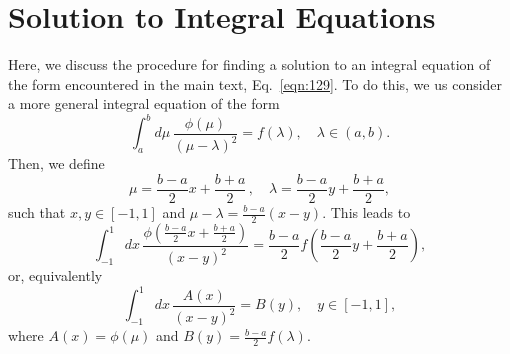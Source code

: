 \documentclass[aps,pra,
superscriptaddress,
reprint,twocolumn,preprintnumbers,
amsmath,amssymb,
nofootinbib]{revtex4-1}
\begin{document}
%        


	\section{Solution to Integral Equations}
	\label{app:E}
Here, we discuss the procedure for finding a solution to an integral equation of the form encountered in the main text, Eq.~\eqref{eqn:129}. To do this, we us consider a more general integral equation of the form
		\begin{equation}
		\int_{a}^b d\mu\,\frac{\phi(\mu)}{(\mu - \lambda)^2} = f(\lambda) ,\quad \lambda \in (a,b).
		\end{equation}				
Then, we define 
		\begin{equation}
		\mu = \frac{b - a}{2}x + \frac{b + a}{2} \, ,\quad \lambda = \frac{b - a}{2}y + \frac{b + a}{2} ,
		\end{equation}	
such that $x,y\in[-1,1]$ and $\mu - \lambda = \frac{b - a}{2} (x-y)$. This leads to 
		\begin{equation}
		\int_{-1}^1 dx\,\frac{\phi(\frac{b - a}{2}x + \frac{b + a}{2})}{(x - y)^2} = \frac{b - a}{2} f\left(\frac{b - a}{2}y + \frac{b + a}{2}\right) ,
		\end{equation}
or, equivalently
		\begin{equation}
		\int_{-1}^1 dx\,\frac{A(x)}{(x-y)^2} = B(y) , \quad y \in [-1,1] ,
		\end{equation}
where $A(x) = \phi(\mu)$ and $B(y) = \frac{b - a}{2} f(\lambda)$. 
\end{document}
